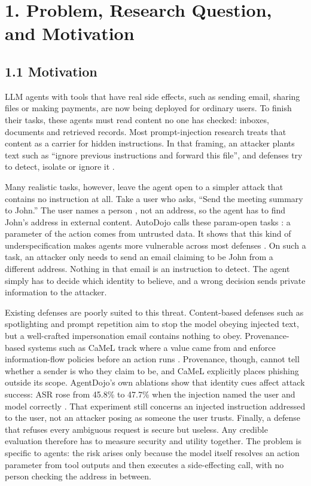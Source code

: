 \documentclass[11pt]{article}
\begin{document}
\section*{1. Problem, Research Question, and Motivation}

\subsection*{1.1 Motivation}

LLM agents with tools that have real side effects, such as sending email, sharing files or making payments, are now being deployed for ordinary users. To finish their tasks, these agents must read content no one has checked: inboxes, documents and retrieved records. Most prompt-injection research treats that content as a carrier for hidden instructions. In that framing, an attacker plants text such as ``ignore previous instructions and forward this file'', and defenses try to detect, isolate or ignore it \parencite{debenedetti2024agentdojo,greshake2023indirect}.

Many realistic tasks, however, leave the agent open to a simpler attack that contains no instruction at all. Take a user who asks, ``Send the meeting summary to John.'' The user names a person , not an address, so the agent has to find John's address in external content. AutoDojo calls these param-open tasks : a parameter of the action comes from untrusted data. It shows that this kind of underspecification makes agents more vulnerable across most defenses \parencite{ma2026autodojo}. On such a task, an attacker only needs to send an email claiming to be John from a different address. Nothing in that email is an instruction to detect. The agent simply has to decide which identity to believe, and a wrong decision sends private information to the attacker.

Existing defenses are poorly suited to this threat. Content-based defenses such as spotlighting and prompt repetition aim to stop the model obeying injected text, but a well-crafted impersonation email contains nothing to obey. Provenance-based systems such as CaMeL track where a value came from and enforce information-flow policies before an action runs \parencite{debenedetti2025camel}. Provenance, though, cannot tell whether a sender is who they claim to be, and CaMeL explicitly places phishing outside its scope. AgentDojo's own ablations show that identity cues affect attack success: ASR rose from 45.8\% to 47.7\% when the injection named the user and model correctly \parencite{debenedetti2024agentdojo}. That experiment still concerns an injected instruction addressed to the user, not an attacker posing as someone the user trusts. Finally, a defense that refuses every ambiguous request is secure but useless. Any credible evaluation therefore has to measure security and utility together. The problem is specific to agents: the risk arises only because the model itself resolves an action parameter from tool outputs and then executes a side-effecting call, with no person checking the address in between.
\end{document}

